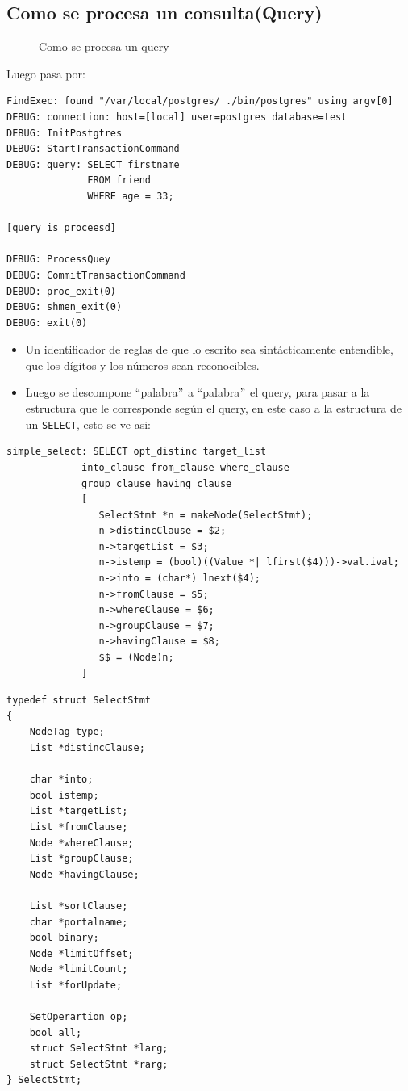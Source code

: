 \subsection{Como se procesa un consulta(Query)}
\begin{figure}[H]
\centering
{}
\caption{Como se procesa un query} \label{fig:comoprocesaquery2}
\end{figure}

Luego pasa por:
 
\lstset{language=sql,breaklines=true}
\begin{lstlisting}
FindExec: found "/var/local/postgres/ ./bin/postgres" using argv[0]
DEBUG: connection: host=[local] user=postgres database=test
DEBUG: InitPostgtres
DEBUG: StartTransactionCommand
DEBUG: query: SELECT firstname
			  FROM friend
			  WHERE age = 33;
			  
[query is proceesd]			  	

DEBUG: ProcessQuey
DEBUG: CommitTransactionCommand
DEBUD: proc_exit(0)
DEBUG: shmen_exit(0)
DEBUG: exit(0)
\end{lstlisting}
 
 \begin{itemize}
 \item Un identificador de reglas de que lo escrito sea sint\'acticamente entendible, que los d\'igitos y los n\'umeros sean reconocibles.
 \item Luego se descompone ``palabra$"$ a ``palabra$"$ el query, para pasar a la estructura que le corresponde seg\'un el query, en este caso a la estructura de un \texttt{SELECT}, esto se ve asi:
\end{itemize}
\lstset{language=sql,breaklines=true}
\label{fig:codigosqlc}
\begin{lstlisting}
simple_select: SELECT opt_distinc target_list
			 into_clause from_clause where_clause
			 group_clause having_clause
			 [
			 	SelectStmt *n = makeNode(SelectStmt);
			 	n->distincClause = $2;
			 	n->targetList = $3;
			 	n->istemp = (bool)((Value *| lfirst($4)))->val.ival;
			 	n->into = (char*) lnext($4);
			 	n->fromClause = $5;
			 	n->whereClause = $6;
				n->groupClause = $7;
				n->havingClause = $8;
				$$ = (Node)n;			 	
			 ]	
\end{lstlisting}

\lstset{language=c,breaklines=true}
\begin{lstlisting}
typedef struct SelectStmt
{
	NodeTag	type;
	List *distincClause;
	
	char *into;
	bool istemp;
	List *targetList;
	List *fromClause;
	Node *whereClause;
	List *groupClause;
	Node *havingClause;
	
	List *sortClause;
	char *portalname;
	bool binary;
	Node *limitOffset;
	Node *limitCount;
	List *forUpdate;
	
	SetOperartion op;
	bool all;
	struct SelectStmt *larg;
	struct SelectStmt *rarg;		
} SelectStmt;	
\end{lstlisting}

